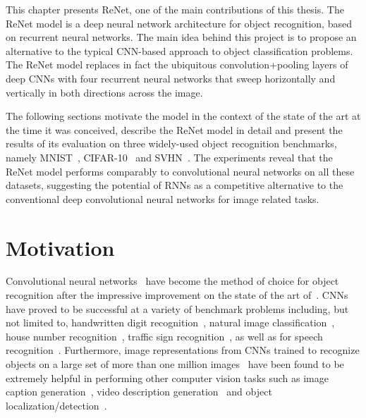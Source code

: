 This chapter presents ReNet, one of the main contributions of this thesis.
The ReNet model is a deep neural network architecture for object recognition,
based on recurrent neural networks. The main idea behind this project is to
propose an alternative to the typical CNN-based approach to object
classification problems. The ReNet model replaces in fact the ubiquitous
convolution+pooling layers of deep CNNs with four recurrent neural networks
that sweep horizontally and vertically in both directions across the image.

The following sections motivate the model in the context of the state of the
art at the time it was conceived, describe the ReNet model in detail and
present the results of its evaluation on three widely-used object recognition
benchmarks, namely  MNIST~\citep{Lecun99objectrecognition},
CIFAR-10~\citep{KrizhevskyHinton2009} and SVHN~\citep{Netzer-wkshp-2011}. The
experiments reveal that the ReNet model performs comparably to convolutional
neural networks on all these datasets, suggesting the potential of RNNs as a
competitive alternative to the conventional deep convolutional neural networks
for image related tasks.


\section{Motivation}

Convolutional neural networks~\cite[CNN,][]{Fukushima80,LeCun89} have become
the method of choice for object recognition after the impressive improvement on
the state of the art of~\cite{Krizhevsky-2012}. CNNs have proved to be
successful at a variety of benchmark problems including, but not limited to,
handwritten digit recognition~\citep[see, e.g.,][]{Ciresan-2012}, natural image
classification~\citep[see, e.g.,][]{Lin2014,Simonyan2015,szegedy2014going},
house number recognition~\citep[see, e.g.,][]{Goodfellow+et+al-ICLR2014a},
traffic sign recognition~\citep[see, e.g.,][]{Ciresan-et-al-2012}, as well as
for speech recognition~\citep[see, e.g.,][]{Hamid2012, sainath2013,
toth2014combining}.  Furthermore, image representations from CNNs trained to
recognize objects on a large set of more than one million
images~\citep{Simonyan2015,szegedy2014going} have been found to be extremely
helpful in performing other computer vision tasks such as image caption
generation~\citep[see, e.g.,][]{Vinyals-et-al-arxiv2014,Xu-et-al-arxiv2015},
video description generation~\citep[see, e.g.,][]{Li2015} and object
localization/detection~\citep[see, e.g.,][]{Sermanet14}.

